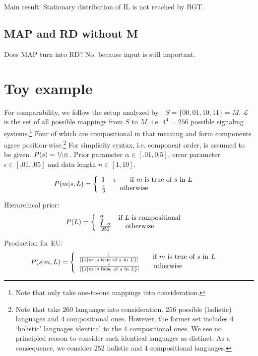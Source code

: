 \documentclass[12pt]{article}
\begin{document}
Main result: Stationary distribution of IL is not reached by BGT.
\subsection{MAP and RD without M}
Does MAP turn into RD? No, because input is still important.

\section{Toy example}
For comparability, we follow the setup analyzed by \citet[\S 6]{griffths+kalish:2007}. $S = \{00,01,10,11\} = M$. $\mathcal{L}$ is the set of all possible mappings from $S$ to $M$, i.e. $4^4 = 256$ possible signaling systems.\footnote{Note that \citet{griffiths+kalish:2007} only take one-to-one mappings into consideration.} Four of which are compositional in that meaning and form components agree position-wise.\footnote{Note that \citet{griffiths+kalish:2007} take $260$ languages into consideration. $256$ possible (holistic) languages and $4$ compositional ones. However, the former set includes $4$ `holistic' languages identical to the $4$ compositional ones. We see no principled reason to consider such identical languages as distinct. As a consequence, we consider $252$ holistic and $4$ compositional languages.} For simplicity syntax, i.e. component order, is assumed to be given. $P(s) = \nicefrac{1}{|S|}$. Prior parameter $\alpha \in [.01,0.5]$, error parameter $\epsilon \in [.01,.05]$ and data length $n \in [1,10]$.

\begin{align}
P(m|s,L) &= \left\{\begin{array}{l} 1 - \epsilon \qquad \textnormal{if $m$ is true of $s$ in $L$}\\
\frac{\epsilon}{3} \qquad \textnormal{otherwise}\end{array}\right.
\end{align}

Hierarchical prior:
\begin{align}
P(L) &= \left\{\begin{array}{l} \frac{\alpha}{4} \qquad \textnormal{if $L$ is compositional}\\
\frac{1 - \alpha}{252} \qquad \textnormal{otherwise}\end{array}\right.
\end{align}

Production for EU:
\begin{align}
P(s|m,L) &= \left\{\begin{array}{l} \frac{1}{|\{s | \textnormal{$m$ is true of $s$ in $L$}\}|} \qquad \textnormal{if $m$ is true of $s$ in $L$}\\
\frac{\epsilon}{|\{s | \textnormal{$m$ is false of $s$ in $L$}\}|} \qquad \textnormal{otherwise}\end{array}\right.
\end{align}
\end{document}
